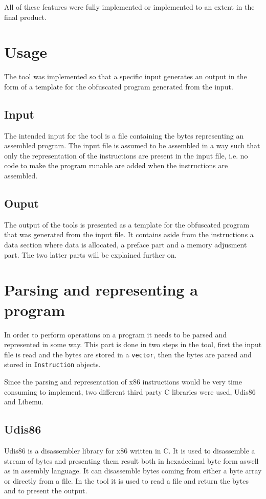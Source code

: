 \documentclass[11pt,twoside]{eitExjobb}
\begin{document}
\noindent All of these features were fully implemented or implemented to an extent in the final product. 

\section{Usage}
The tool was implemented so that a specific input generates an output in the form of a template for the obfuscated program generated from the input.  

\subsection{Input}
The intended input for the tool is a file containing the bytes representing an assembled program. The input file is assumed to be assembled in a way such that only the representation of the instructions are present in the input file, i.e. no code to make the program runable are added when the instructions are assembled.

\subsection{Ouput}
The output of the tools is presented as a template for the obfuscated program that was generated from the input file. It contains aside from the instructions a data section where data is allocated, a preface part and a memory adjusment part. The two latter parts will be explained further on.

\section{Parsing and representing a program}
In order to perform operations on a program it needs to be parsed and represented in some way. This part is done in two steps in the tool, first the input file is read and the bytes are stored in a \texttt{vector}, then the bytes are parsed and stored in \texttt{Instruction} objects. 

Since the parsing and representation of x86 instructions would be very time consuming to implement, two different third party C libraries were used, Udis86 and Libemu. 

\subsection{Udis86}
Udis86 is a disassembler library for x86 written in C. It is used to disassemble a stream of bytes and presenting them result both in hexadecimal byte form aswell as in assembly language. It can disassemble bytes coming from either a byte array or directly from a file. In the tool it is used to read a file and return the bytes and to present the output.\cite{udis}
\end{document}
